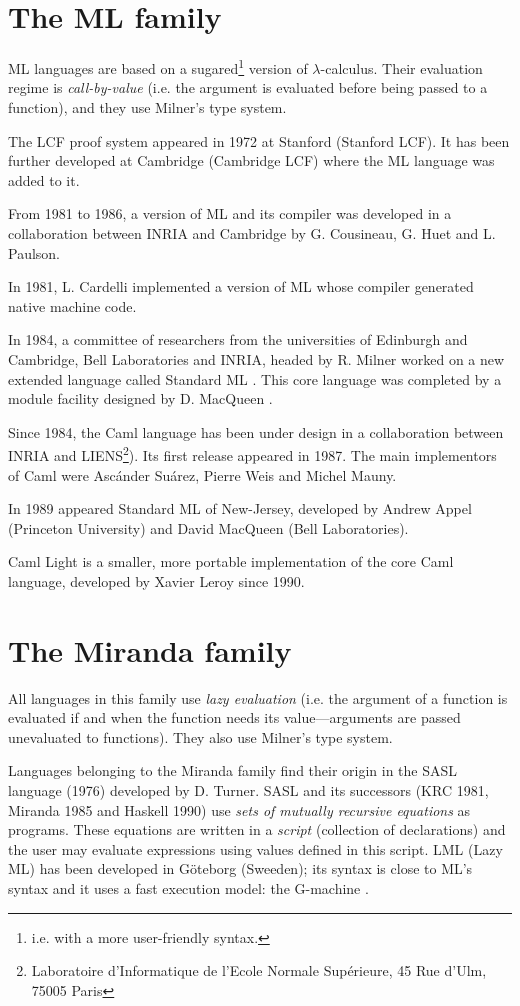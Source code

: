 \section{The ML family}

ML languages are based on a sugared\footnote{i.e. with a more user-friendly
syntax.}
version of $\lambda$-calculus.
Their evaluation regime is {\em call-by-value} (i.e. the argument is
evaluated before being passed to a function), and they use Milner's type
system.

The LCF proof system appeared in 1972 at Stanford (Stanford LCF). It
has been further developed at Cambridge (Cambridge LCF) where the ML
language was added to it.

From 1981 to 1986, a version of ML and its compiler was developed
in a collaboration between INRIA and Cambridge by G. Cousineau, G. Huet
and L. Paulson.

In 1981, L. Cardelli implemented a version of ML whose compiler generated
native machine code.

In 1984, a committee of researchers from the universities of Edinburgh
and Cambridge, Bell Laboratories and INRIA, headed by R. Milner worked
on a new extended language called Standard ML \cite{ProposalSML}. This core
language was completed by a module facility designed by D. MacQueen
\cite{SMLModules}.

Since 1984, the Caml language has been under design in a collaboration
between INRIA and LIENS\footnote{Laboratoire d'Informatique de l'Ecole
Normale Sup\'erieure, 45 Rue d'Ulm, 75005 Paris}). Its first release
appeared in 1987. The main implementors of Caml were Asc\'ander
Su\'arez, Pierre Weis and Michel Mauny.

In 1989 appeared Standard ML of New-Jersey, developed by Andrew Appel
(Princeton University) and David MacQueen (Bell Laboratories).

Caml Light is a smaller, more portable implementation of the core Caml
language, developed by Xavier Leroy since 1990.

\section{The Miranda family}

All languages in this family use {\em lazy evaluation} (i.e. the argument of a
function is evaluated if and when the function needs its value---arguments
are passed unevaluated to functions).
They also use Milner's type system.

Languages belonging to the Miranda family find their origin in the
SASL language \cite{SASL} (1976) developed by D. Turner. SASL and its
successors (KRC \cite{KRC} 1981, Miranda \cite{Miranda85} 1985 and
Haskell \cite{Haskell90} 1990) use {\em sets of mutually recursive
equations} as programs. These equations are written in a {\em script}
(collection of declarations) and the user may evaluate expressions
using values defined in this script.  LML (Lazy ML) has been developed
in G\"oteborg (Sweeden); its syntax is close to ML's syntax and it
uses a fast execution model: the G-machine \cite{GMachine}.

